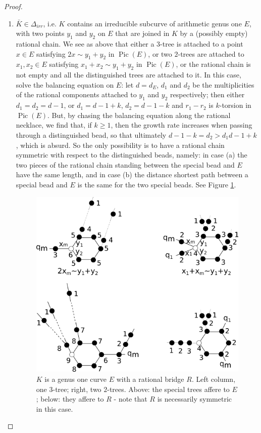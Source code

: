 \documentclass[11pt]{amsart}
\newcommand{\Pic}{\operatorname{Pic}}
\theoremstyle{plain}
\theoremstyle{definition}
\begin{document}
\begin{proof}
\begin{enumerate}[leftmargin=.6cm]
 \item $\bar K\in\Delta_{irr}$, i.e. $K$ contains an irreducible subcurve of arithmetic genus one $E$, with two points $y_1$ and $y_2$ on $E$ that are joined in $K$ by a (possibly empty) rational chain. We see as above that either a $3$-tree is attached to a point $x\in E$ satisfying $2x\sim y_1+y_2$ in $\Pic(E)$, or two $2$-trees are attached to $x_1,x_2\in E$ satisfying $x_1+x_2\sim y_1+y_2$ in $\Pic(E)$, or the rational chain is not empty and all the distinguished trees are attached to it. In this case, solve the balancing equation on $E$: let $d=d_E$, $d_1$ and $d_2$ be the multiplicities of the rational components attached to $y_1$ and $y_2$ respectively; then either $d_1=d_2=d-1$, or $d_1=d-1+k$, $d_2=d-1-k$ and $r_1-r_2$ is $k$-torsion in $\Pic(E)$. But, by chasing the balancing equation along the rational necklace, we find that, if $k\geq 1$, then the growth rate increases when passing through a distinguished bead, so that ultimately $d-1-k=d_2>d_1d-1+k$, which is absurd. So the only possibility is to have a rational chain symmetric with respect to the distinguished beads, namely: in case (a) the two pieces of the rational chain standing between the special bead and $E$ have the same length, and in case (b) the distance shortest path between a special bead and $E$ is the same for the two special beads. See Figure \ref{fig:ER}.
 
  \begin{figure}
 \includegraphics[width=.8\textwidth]{ERexample}
 \caption{$K$ is a genus one curve $E$ with a rational bridge $R$. Left column, one $3$-tree; right, two $2$-trees. Above: the special trees affere to $E$; below: they affere to $R$ - note that $R$ is necessarily symmetric in this case.}\label{fig:ER}
  \end{figure}
 

\end{enumerate}
\end{proof}
\end{document}
